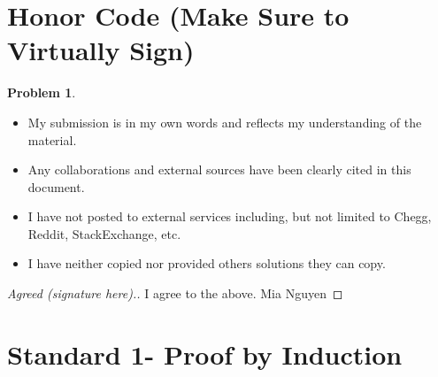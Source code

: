 \documentclass[11pt]{article}
\theoremstyle{definition}
\theoremstyle{definition}
\newtheorem{required}{Problem}
\theoremstyle{definition}
\begin{document}
\section{Honor Code (Make Sure to Virtually Sign)} \label{HonorCode}

\begin{required}
\begin{itemize}
\item My submission is in my own words and reflects my understanding of the material.
\item Any collaborations and external sources have been clearly cited in this document.
\item I have not posted to external services including, but not limited to Chegg, Reddit, StackExchange, etc.
\item I have neither copied nor provided others solutions they can copy.
\end{itemize}

\end{required}

\begin{proof}[Agreed (signature here).]
I agree to the above. Mia Nguyen
\end{proof}


\newpage
\section{Standard 1- Proof by Induction}
\end{document}
